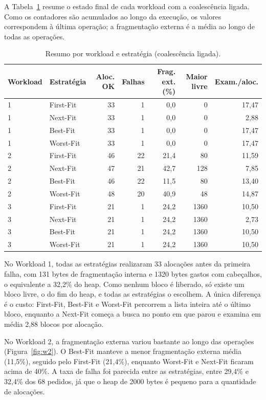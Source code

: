 A Tabela~\ref{tab:resumo} resume o estado final de cada workload com a
coalescência ligada. Como os contadores são acumulados ao longo da execução,
os valores correspondem à última operação; a fragmentação externa é a média ao
longo de todas as operações.

\begin{table}[ht]
\centering
\caption{Resumo por workload e estratégia (coalescência ligada).}
\label{tab:resumo}
\begin{tabular}{llrrrrr}
\hline
Workload & Estratégia & Aloc. OK & Falhas & Frag. ext. (\%) & Maior livre & Exam./aloc. \\
\hline
1 & First-Fit & 33 & 1 & 0,0 & 0 & 17,47 \\
1 & Next-Fit  & 33 & 1 & 0,0 & 0 & 2,88 \\
1 & Best-Fit  & 33 & 1 & 0,0 & 0 & 17,47 \\
1 & Worst-Fit & 33 & 1 & 0,0 & 0 & 17,47 \\
\hline
2 & First-Fit & 46 & 22 & 21,4 & 80  & 11,59 \\
2 & Next-Fit  & 47 & 21 & 42,7 & 128 & 7,85 \\
2 & Best-Fit  & 46 & 22 & 11,5 & 80  & 13,40 \\
2 & Worst-Fit & 48 & 20 & 40,9 & 48  & 14,87 \\
\hline
3 & First-Fit & 21 & 1 & 24,2 & 1360 & 10,50 \\
3 & Next-Fit  & 21 & 1 & 24,2 & 1360 & 2,73 \\
3 & Best-Fit  & 21 & 1 & 24,2 & 1360 & 10,50 \\
3 & Worst-Fit & 21 & 1 & 24,2 & 1360 & 10,50 \\
\hline
\end{tabular}
\end{table}

No Workload 1, todas as estratégias realizaram 33 alocações antes da primeira
falha, com 131 bytes de fragmentação interna e 1320 bytes gastos com
cabeçalhos, o equivalente a 32,2\% do heap. Como nenhum bloco é liberado, só
existe um bloco livre, o do fim do heap, e todas as estratégias o escolhem.
A única diferença é o custo: First-Fit, Best-Fit e Worst-Fit percorrem a lista
inteira até o último bloco, enquanto a Next-Fit começa a busca no ponto em que
parou e examina em média 2,88 blocos por alocação.

No Workload 2, a fragmentação externa variou bastante ao longo das operações
(Figura~\ref{fig:w2}). O Best-Fit manteve a menor fragmentação externa média
(11,5\%), seguido pelo First-Fit (21,4\%), enquanto Worst-Fit e Next-Fit
ficaram acima de 40\%. A taxa de falha foi parecida entre as estratégias,
entre 29,4\% e 32,4\% dos 68 pedidos, já que o heap de 2000 bytes é pequeno
para a quantidade de alocações.

